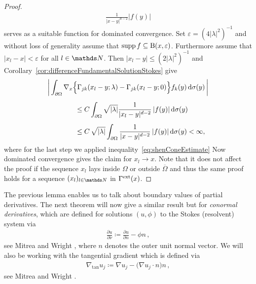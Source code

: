 \begin{proof}
  \begin{align*}
    \frac{1}{|x -y|^{d - 2}} |f(y)|
  \end{align*}
  serves as a suitable function for dominated convergence.
  Set $\varepsilon = (4 |\lambda|^2)^{-1}$ and without loss of generality assume that $\operatorname{supp} f \subseteq \mathrm{B}(x,\varepsilon)$.
  Furthermore assume that $|x_l - x| < \varepsilon$ for all $l \in \N$.
  Then $|x_l - y| \leq (2|\lambda|^2)^{-1}$ and Corollary~\ref{cor:differenceFundamentalSolutionStokes} give
  \begin{align*}
    &\bigg| \int_{\partial\Omega} \nabla_x \Big\{ \Gamma_{jk}(x_l - y; \lambda) - \Gamma_{jk}(x_l - y; 0)\Big\} f_k(y) \, {\operatorname{d}\!{\sigma}}(y)\, \bigg| \\[0.5em]
    &\qquad\qquad\leq C \int_{\partial\Omega} \sqrt{|\lambda|} \frac{1}{|x_l - y|^{d - 2}}\, |f(y)| \, {\operatorname{d}\!{\sigma}}(y) \\[0.5em]
    &\qquad\qquad\leq C \,\sqrt{|\lambda|} \int_{\partial\Omega} \frac{1}{|x - y|^{d - 2}}\, |f(y)| \, {\operatorname{d}\!{\sigma}}(y) < \infty,
  \end{align*}
  where for the last step we applied inequality~\eqref{eq:shenConeEstimate}
  Now dominated convergence gives the claim for $x_l \to x$.
  Note that it does not affect the proof if the sequence $x_l$ lays inside $\Omega$ or outside $\overline\Omega$ and thus the same proof holds for a sequence $(x_l)_{l \in \N}$ in $\Gamma^{\mathrm{ext}}(x)$.
\end{proof}

The previous lemma enables us to talk about boundary values of partial derivatives. 
The next theorem will now give a similar result but for \emph{conormal derivatives}, which are defined for solutions $(u,\phi)$ to the Stokes (resolvent) system via 
\begin{align}
  \label{eq:conormalDerivative}
  \frac{\partial u}{\partial \nu} \coloneqq \frac{\partial u}{\partial n} - \phi n\,,
\end{align}
see Mitrea and Wright \cite[Eq.\@~(1.2)]{mitreaWright}, where $n$ denotes the outer unit normal vector.
We will also be working with the tangential gradient which is defined via
\begin{align}
  \label{eq:tangentialGradient}
  \nabla_{\mathrm{tan}} u_j \coloneqq \nabla u_j - \big(\nabla u_j \cdot  n\big) n\,,
\end{align}
see Mitrea and Wright \cite[p.\@~17]{mitreaWright}.

